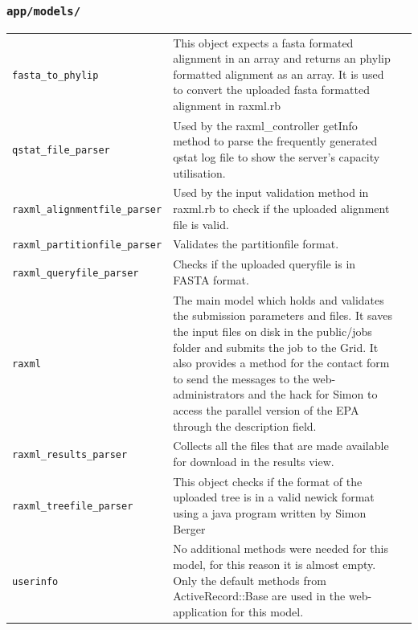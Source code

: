 \documentclass{scrartcl}
\begin{document}
				\subsubsection{\texttt{app/models/}}
					\begin{tabular}[c]{lp{8.8cm}l}
						\texttt{fasta\_to\_phylip}  & This object expects a fasta formated alignment in an array and returns an phylip formatted alignment as an array. It is used to convert the uploaded fasta formatted alignment in raxml.rb\\
						\texttt{qstat\_file\_parser}  & Used by the raxml\_controller getInfo method to parse the frequently generated qstat log file to show the server's capacity utilisation.\\
						\texttt{raxml\_alignmentfile\_parser}  & Used by the input validation method in raxml.rb to check if the uploaded alignment file is valid. \\
						\texttt{raxml\_partitionfile\_parser}  & Validates the partitionfile format. \\
						\texttt{raxml\_queryfile\_parser}  &  Checks if the uploaded queryfile is in FASTA format.\\
						\texttt{raxml}  & The main model which holds and validates the submission parameters and files. It saves the input files on disk in the public/jobs folder and submits the job to the Grid. It also provides a method for the contact form to send the messages to the web-administrators and the hack for Simon to access the parallel version of the EPA through the description field.\\
						\texttt{raxml\_results\_parser}  & Collects all the files that are made available for download in the results view.\\
						\texttt{raxml\_treefile\_parser}  & This object checks if the format of the uploaded tree is in a valid newick format using a java program written by Simon Berger\\
						\texttt{userinfo}  & No additional  methods were needed for this model, for this reason it is almost empty. Only the default methods from ActiveRecord::Base are used in the web-application for this model. \\
					\end{tabular}
\end{document}
